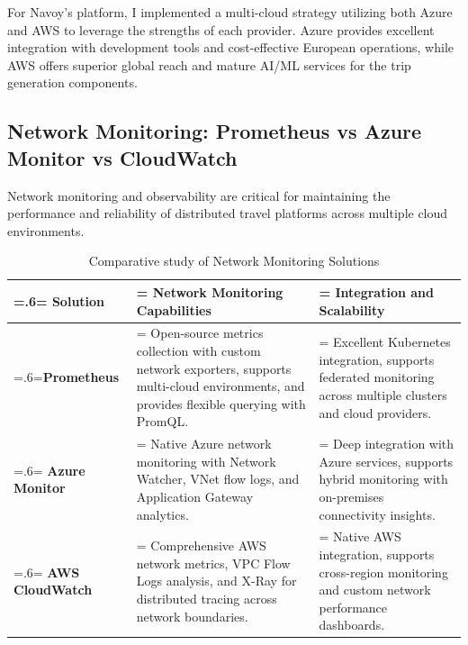For Navoy's platform, I implemented a multi-cloud strategy utilizing both Azure and AWS to leverage the strengths of each provider. Azure provides excellent integration with development tools and cost-effective European operations, while AWS offers superior global reach and mature AI/ML services for the trip generation components.

\subsection{Network Monitoring: Prometheus vs Azure Monitor vs CloudWatch}
Network monitoring and observability are critical for maintaining the performance and reliability of distributed travel platforms across multiple cloud environments.

\begin{table}[H]
    \renewcommand{\arraystretch}{1.5}%
    \caption{Comparative study of Network Monitoring Solutions}
    \centering
    \medskip
    \begin{tabularx}{1\textwidth} {
            | >{\hsize=.6\hsize\linewidth=\hsize\centering\arraybackslash}X
            | >{\hsize=1.2\hsize\linewidth=\hsize\justifying\arraybackslash}X
            | >{\hsize=1.2\hsize\linewidth=\hsize\justifying\arraybackslash}X |}
        \hline
        \rowcolor{primary} \textbf {Solution} & \textbf {Network Monitoring Capabilities}                                                                                                              & \textbf {Integration and Scalability}                                                                                   \\
        \hline
        \textbf {Prometheus}                  & \noindent Open-source metrics collection with custom network exporters, supports multi-cloud environments, and provides flexible querying with PromQL. & \noindent Excellent Kubernetes integration, supports federated monitoring across multiple clusters and cloud providers. \\
        \hline
        \textbf {Azure Monitor}               & \noindent Native Azure network monitoring with Network Watcher, VNet flow logs, and Application Gateway analytics.                                     & \noindent Deep integration with Azure services, supports hybrid monitoring with on-premises connectivity insights.      \\
        \hline
        \textbf {AWS CloudWatch}              & \noindent Comprehensive AWS network metrics, VPC Flow Logs analysis, and X-Ray for distributed tracing across network boundaries.                      & \noindent Native AWS integration, supports cross-region monitoring and custom network performance dashboards.           \\
        \hline
    \end{tabularx}
\end{table}


